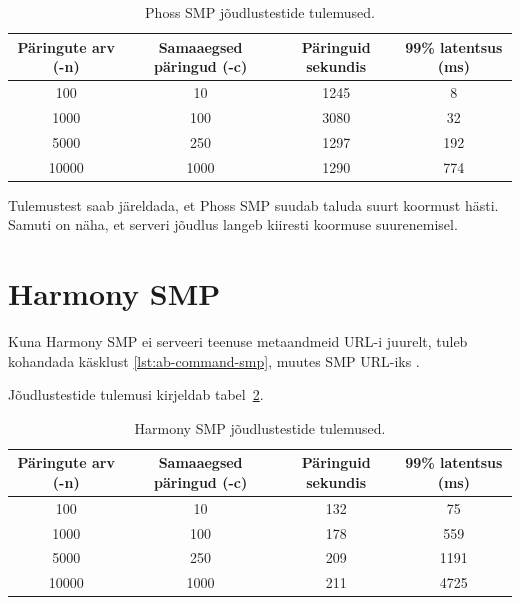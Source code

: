 \begin{table}[H]
    \caption{Phoss SMP jõudlustestide tulemused.}
    \label{tab:phoss-smp-performance-results}
    \begin{tabular}{|c|c|c|c|}
        \hline
        Päringute arv (-n) & Samaaegsed päringud (-c) & Päringuid sekundis & 99\% latentsus (ms) \\
        \hline
        100 & 10 & 1245 & 8 \\
        \hline
        1000 & 100 & 3080 & 32 \\
        \hline
        5000 & 250 & 1297 & 192 \\
        \hline
        10000 & 1000 & 1290 & 774 \\
        \hline
    \end{tabular}
\end{table}

Tulemustest saab järeldada, et Phoss SMP suudab taluda suurt koormust hästi.
Samuti on näha, et serveri jõudlus langeb kiiresti koormuse suurenemisel.



\section{Harmony SMP}

Kuna Harmony SMP ei serveeri teenuse metaandmeid URL-i juurelt, tuleb kohandada
käsklust \ref{lst:ab-command-smp}, muutes SMP URL-iks 
\texttt{}.

Jõudlustestide tulemusi kirjeldab tabel~\ref{tab:harmony-smp-performance-results}.

\begin{table}[H]
    \caption{Harmony SMP jõudlustestide tulemused.}
    \label{tab:harmony-smp-performance-results}
    \begin{tabular}{|c|c|c|c|}
        \hline
        Päringute arv (-n) & Samaaegsed päringud (-c) & Päringuid sekundis & 99\% latentsus (ms) \\
        \hline
        100 & 10 & 132 & 75 \\
        \hline
        1000 & 100 & 178 & 559 \\
        \hline
        5000 & 250 & 209 & 1191 \\
        \hline
        10000 & 1000 & 211 & 4725 \\
        \hline
    \end{tabular}
\end{table}

